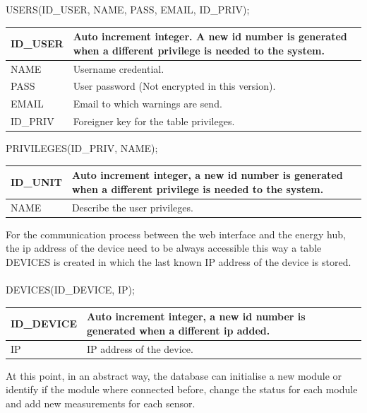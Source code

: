 USERS(ID\_USER, NAME, PASS, EMAIL, ID\_PRIV);

\begin{table}[H]
\centering
	\begin{tabular}{| p{2cm} | p{10cm} |}
		\hline
		ID\_USER & Auto increment integer. A new id number is generated when a different privilege is needed to the system. \\\hline
		NAME & Username credential. \\\hline
		PASS & User password (Not encrypted in this version). \\\hline
		EMAIL & Email to which warnings are send. \\\hline
		ID\_PRIV & Foreigner key for the table privileges. \\\hline
	\end{tabular}
\end{table}

PRIVILEGES(ID\_PRIV, NAME);

\begin{table}[H]
\centering
	\begin{tabular}{| p{2cm} | p{10cm} |}
		\hline
		ID\_UNIT & Auto increment integer, a new id number is generated when a different privilege is needed to the system. \\\hline
		NAME & Describe the user privileges. \\\hline
	\end{tabular}
\end{table}
For the communication process between the web interface and the energy hub, the ip address of the device need to be always accessible this way a table DEVICES is created in which the last known IP address of the device is stored.
\\\\

DEVICES(ID\_DEVICE, IP);

\begin{table}[H]
\centering
	\begin{tabular}{| p{2cm} | p{10cm} |}
		\hline
		ID\_DEVICE & Auto increment integer, a new id number is generated when a different ip added. \\\hline
		IP & IP address of the device. \\\hline
	\end{tabular}
\end{table}

At this point, in an abstract way, the database can initialise a new module or identify if the module where connected before, change the status for each module and add new measurements for each sensor.

